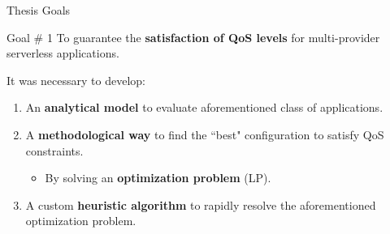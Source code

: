 \documentclass[13.5pt]{beamer}
\newcommand{\B}[1]{\textcolor{TorVergataColor}{\textbf{#1}}}
\begin{document}
\begin{frame}{Thesis Goals}
	
	\begin{block}{Goal $\#$ 1}
		\centering
	To guarantee the \B{satisfaction of QoS levels} for multi-provider serverless applications. 
	\end{block}

	\vspace{\baselineskip}
	It was necessary to develop:
	\vspace{\baselineskip} 
	
	\begin{enumerate}
		\justifying
	
	\item An \B{analytical model} to evaluate aforementioned class of applications.

	\vspace{\baselineskip} 
	
	\item A \B{methodological way} to find the ``best" configuration to satisfy QoS constraints.
	\begin{itemize}
		\item By solving an \B{optimization problem} (LP).
	\end{itemize}
	
	
	\vspace{\baselineskip}
	
	\item A custom \B{heuristic algorithm} to rapidly resolve the aforementioned optimization problem.
		
	\end{enumerate}
	\end{frame} 

\end{document}
